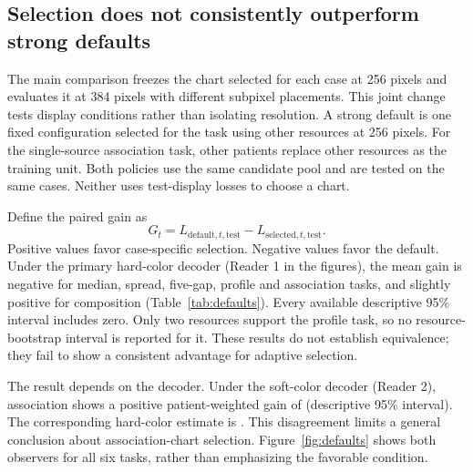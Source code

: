 \documentclass[11pt]{article}
\begin{document}
\subsection*{Selection does not consistently outperform strong defaults}
The main comparison freezes the chart selected for each case at 256 pixels and evaluates it at 384 pixels with different subpixel placements. This joint change tests display conditions rather than isolating resolution. A strong default is one fixed configuration selected for the task using other resources at 256 pixels. For the single-source association task, other patients replace other resources as the training unit. Both policies use the same candidate pool and are tested on the same cases. Neither uses test-display losses to choose a chart.

Define the paired gain as
\begin{equation}
 G_t=L_{\mathrm{default},t,\mathrm{test}}-L_{\mathrm{selected},t,\mathrm{test}}.
\end{equation}
Positive values favor case-specific selection. Negative values favor the default. Under the primary hard-color decoder (Reader 1 in the figures), the mean gain is negative for median, spread, five-gap, profile and association tasks, and slightly positive for composition (Table~\ref{tab:defaults}). Every available descriptive 95\% interval includes zero. Only two resources support the profile task, so no resource-bootstrap interval is reported for it. These results do not establish equivalence; they fail to show a consistent advantage for adaptive selection.

\begin{table}[ht]\centering\footnotesize
\caption{\textbf{Frozen selection versus a strong default at the test display.} Primary hard-color decoder. Gains and losses are in the task-specific units of Table~\ref{tab:tasks}; positive gain favors case-specific selection. Means weight resources equally, after participant aggregation where applicable; association weights 46 patients equally. All default and selected policies decode successfully. Figure~\ref{fig:defaults} shows the descriptive uncertainty intervals for both algorithms.}\label{tab:defaults}

\end{table}

The result depends on the decoder. Under the soft-color decoder (Reader 2), association shows a positive patient-weighted gain of \SoftAssociation\; (descriptive 95\% interval). The corresponding hard-color estimate is \HardAssociation. This disagreement limits a general conclusion about association-chart selection. Figure~\ref{fig:defaults} shows both observers for all six tasks, rather than emphasizing the favorable condition.
\end{document}
